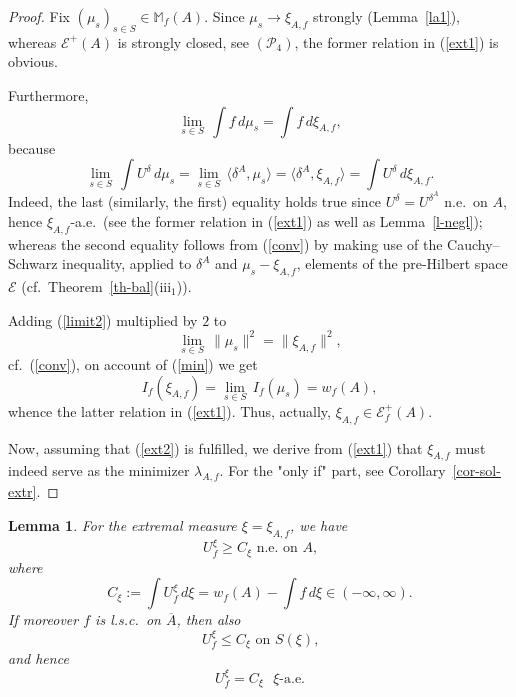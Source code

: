 \documentclass[12pt,a4paper,reqno]{amsart} %
\theoremstyle{lause}
\theoremstyle{maaritelma}
\theoremstyle{lause}
\newtheorem{lemma}[theorem]{Lemma}
\theoremstyle{maaritelma}
\numberwithin{equation}{section}
\begin{document}
\begin{proof} Fix $(\mu_s)_{s\in S}\in\mathbb M_f(A)$. Since $\mu_s\to\xi_{A,f}$ strongly (Lemma~\ref{la1}), whereas $\mathcal E^+(A)$ is strongly closed, see $(\mathcal P_4)$, the former relation in (\ref{ext1}) is obvious.

Furthermore,
\begin{equation}\label{limit2}\lim_{s\in S}\,\int f\,d\mu_s=\int f\,d\xi_{A,f},\end{equation}
because
\begin{equation*}\label{limit2'}
\lim_{s\in S}\,\int U^\delta\,d\mu_s=\lim_{s\in S}\,\langle\delta^A,\mu_s\rangle=\langle\delta^A,\xi_{A,f}\rangle=\int U^\delta\,d\xi_{A,f}.
\end{equation*}
Indeed, the last (similarly, the first) equality holds true since $U^\delta=U^{\delta^A}$ n.e.\ on $A$, hence $\xi_{A,f}$-a.e.\ (see the former relation in (\ref{ext1}) as well as Lemma~\ref{l-negl}); whereas the second equality follows from (\ref{conv}) by making use of the Cauchy--Schwarz inequality, applied to $\delta^A$ and $\mu_s-\xi_{A,f}$, elements of the pre-Hil\-bert space $\mathcal E$ (cf.\ Theorem~\ref{th-bal}(iii$_1$)).

Adding (\ref{limit2}) multiplied by $2$ to
\begin{equation}\label{muconv}
\lim_{s\in S}\,\|\mu_s\|^2=\|\xi_{A,f}\|^2,
\end{equation}
cf.\ (\ref{conv}), on account of (\ref{min}) we get
\begin{equation*}\label{limit1}I_f(\xi_{A,f})=\lim_{s\in S}\,I_f(\mu_s)=w_f(A),\end{equation*}
whence the latter relation in (\ref{ext1}). Thus, actually, $\xi_{A,f}\in\mathcal E^+_f(A)$.

Now, assuming that (\ref{ext2}) is fulfilled, we derive from (\ref{ext1}) that $\xi_{A,f}$ must indeed serve as the minimizer $\lambda_{A,f}$. For the "only if" part, see Corollary~\ref{cor-sol-extr}.
\end{proof}

\begin{lemma}\label{LLL}
  For the extremal measure $\xi=\xi_{A,f}$, we have
  \begin{equation}\label{pot-extr}
   U^\xi_f\geqslant C_\xi\text{ \ n.e.\ on $A$,}\end{equation}
  where
  \begin{equation}\label{Xi}C_\xi:=\int U^\xi_f\,d\xi=w_f(A)-\int f\,d\xi\in(-\infty,\infty).\end{equation}
  If moreover $f$ is l.s.c.\ on $\overline{A}$, then also
  \begin{equation}
   U^\xi_f\leqslant C_\xi\text{ \ on $S(\xi)$,}\label{pot-extr2}
  \end{equation}
  and hence
  \begin{equation}
   U^\xi_f=C_\xi\text{ \ $\xi$-a.e.}\label{pot-extr2'}
  \end{equation}
  \end{lemma}
\end{document}
